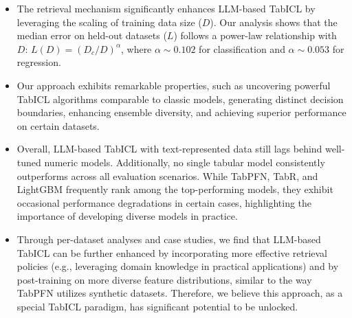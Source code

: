 \begin{itemize}
\item
The retrieval mechanism significantly enhances LLM-based TabICL by leveraging the scaling of training data size ($D$). Our analysis shows that the median error on held-out datasets ($L$) follows a power-law relationship with $D$: $L(D) = (D_c / D)^{\alpha}$, where $\alpha \sim 0.102$ for classification and $\alpha \sim 0.053$ for regression.
\item
Our approach exhibits remarkable properties, such as uncovering powerful TabICL algorithms comparable to classic models, generating distinct decision boundaries, enhancing ensemble diversity, and achieving superior performance on certain datasets.
\item
Overall, LLM-based TabICL with text-represented data still lags behind well-tuned numeric models. Additionally, no single tabular model consistently outperforms across all evaluation scenarios. While TabPFN, TabR, and LightGBM frequently rank among the top-performing models, they exhibit occasional performance degradations in certain cases, highlighting the importance of developing diverse models in practice.
\item
Through per-dataset analyses and case studies, we find that LLM-based TabICL can be further enhanced by incorporating more effective retrieval policies (e.g., leveraging domain knowledge in practical applications) and by post-training on more diverse feature distributions, similar to the way TabPFN utilizes synthetic datasets. Therefore, we believe this approach, as a special TabICL paradigm, has significant potential to be unlocked.
\end{itemize}





